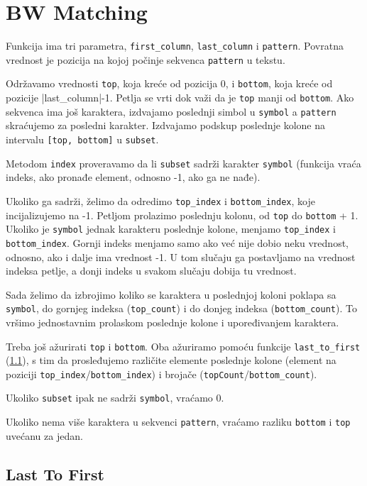 \section{BW Matching}

Funkcija ima tri parametra, \texttt{first\_column}, \texttt{last\_column} i \texttt{pattern}. Povratna vrednost je pozicija na kojoj počinje sekvenca \texttt{pattern} u tekstu.

Održavamo vrednosti \texttt{top}, koja kreće od pozicija 0, i \texttt{bottom}, koja kreće od pozicije |last\_column|-1. Petlja se vrti dok važi da je \texttt{top} manji od \texttt{bottom}. Ako sekvenca ima još karaktera, izdvajamo poslednji simbol u \texttt{symbol} a \texttt{pattern} skraćujemo za posledni karakter. Izdvajamo podskup poslednje kolone na intervalu \texttt{[top, bottom]} u \texttt{subset}. 

Metodom \texttt{index} proveravamo da li \texttt{subset} sadrži karakter \texttt{symbol} (funkcija vraća indeks, ako pronađe element, odnosno -1, ako ga ne nađe). 

Ukoliko ga sadrži, želimo da odredimo \texttt{top\_index} i \texttt{bottom\_index}, koje incijalizujemo na -1. Petljom prolazimo poslednju kolonu, od \texttt{top} do \texttt{bottom} + 1. Ukoliko je \texttt{symbol} jednak karakteru poslednje kolone, menjamo \texttt{top\_index} i \texttt{bottom\_index}. Gornji indeks menjamo samo ako već nije dobio neku vrednost, odnosno, ako i dalje ima vrednost -1. U tom slučaju ga postavljamo na vrednost indeksa petlje, a donji indeks u svakom slučaju dobija tu vrednost.

Sada želimo da izbrojimo koliko se karaktera u poslednjoj koloni poklapa sa \texttt{symbol}, do gornjeg indeksa (\texttt{top\_count}) i do donjeg indeksa (\texttt{bottom\_count}). To vršimo jednostavnim prolaskom poslednje kolone i upoređivanjem karaktera.

Treba još ažurirati \texttt{top} i \texttt{bottom}. Oba ažuriramo pomoću funkcije \texttt{last\_to\_first} (\ref{lastToFirst}), s tim da prosleđujemo različite elemente poslednje kolone (element na poziciji \texttt{top\_index}/\texttt{bottom\_index}) i brojače (\texttt{topCount}/\texttt{bottom\_count}). 

Ukoliko \texttt{subset} ipak ne sadrži \texttt{symbol}, vraćamo 0.

Ukoliko nema više karaktera u sekvenci \texttt{pattern}, vraćamo razliku \texttt{bottom} i \texttt{top} uvećanu za jedan.

\subsection{Last To First}
\label{lastToFirst}

